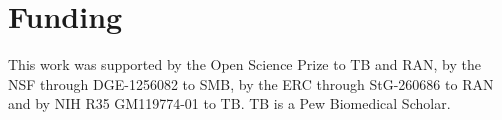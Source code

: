 \documentclass{bioinfo}
\begin{document}
\vspace*{-15pt}


\section*{Funding}

This work was supported by the Open Science Prize to TB and RAN, by the NSF through DGE-1256082 to SMB, by the ERC through StG-260686 to RAN and by NIH R35 GM119774-01 to TB.
TB is a Pew Biomedical Scholar.

\vspace*{-15pt}



\end{document}
